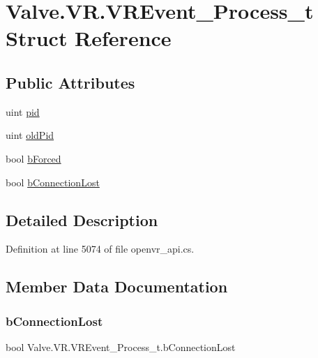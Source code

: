 \hypertarget{struct_valve_1_1_v_r_1_1_v_r_event___process__t}{}\section{Valve.\+V\+R.\+V\+R\+Event\+\_\+\+Process\+\_\+t Struct Reference}
\label{struct_valve_1_1_v_r_1_1_v_r_event___process__t}
\subsection*{Public Attributes}
\begin{DoxyCompactItemize}
\item 
uint \mbox{\hyperlink{struct_valve_1_1_v_r_1_1_v_r_event___process__t_a75e5d1c317b6bad48e9fb6e35967e761}{pid}}
\item 
uint \mbox{\hyperlink{struct_valve_1_1_v_r_1_1_v_r_event___process__t_a81806e9988d82951c56534b8c451e502}{old\+Pid}}
\item 
bool \mbox{\hyperlink{struct_valve_1_1_v_r_1_1_v_r_event___process__t_aa21f1d68c620e6a1b6a468afb265ef77}{b\+Forced}}
\item 
bool \mbox{\hyperlink{struct_valve_1_1_v_r_1_1_v_r_event___process__t_a7e443b02348ff25bd756951acd54ac81}{b\+Connection\+Lost}}
\end{DoxyCompactItemize}


\subsection{Detailed Description}


Definition at line 5074 of file openvr\+\_\+api.\+cs.



\subsection{Member Data Documentation}
\mbox{\label{struct_valve_1_1_v_r_1_1_v_r_event___process__t_a7e443b02348ff25bd756951acd54ac81}} 
\subsubsection{\texorpdfstring{bConnectionLost}{bConnectionLost}}
{\footnotesize\ttfamily bool Valve.\+V\+R.\+V\+R\+Event\+\_\+\+Process\+\_\+t.\+b\+Connection\+Lost}




